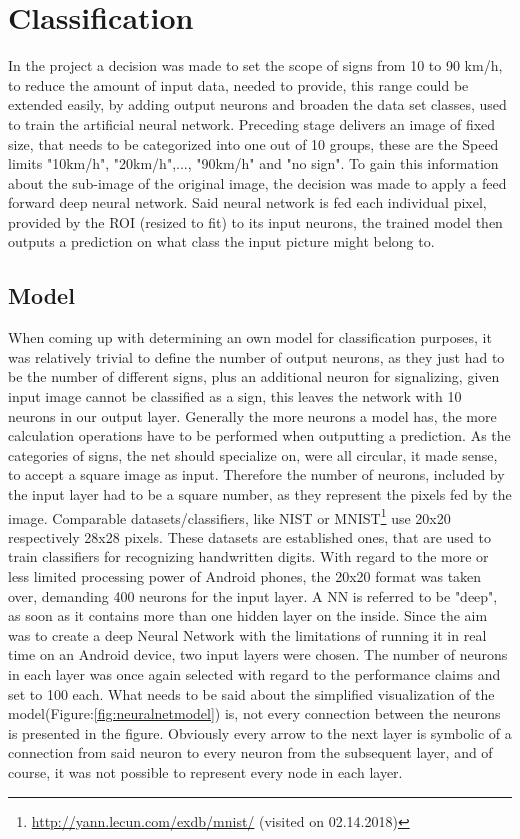 \section{Classification}
In the project a decision was made to set the scope of signs from 10 to 90 km/h, to reduce the amount of input data, needed to provide, this range could be extended easily, by adding output neurons and broaden the data set classes, used to train the artificial neural network. \newline
Preceding stage delivers an image of fixed size, that needs to be categorized into one out of 10 groups, these are the Speed limits "10km/h", "20km/h",..., "90km/h" and "no sign". To gain this information about the sub-image of the original image, the decision was made to apply a feed forward deep neural network. Said neural network is fed each individual pixel, provided by the ROI (resized to fit) to its input neurons, the trained model then outputs a prediction on what class the input picture might belong to.

\subsection{Model}
When coming up with determining an own model for classification purposes, it was relatively trivial to define the number of output neurons, as they just had to be the number of different signs, plus an additional neuron for signalizing, given input image cannot be classified as a sign, this leaves the network with 10 neurons in our output layer. Generally the more neurons a model has, the more calculation operations have to be performed when outputting a prediction.\newline
As the categories of signs, the net should specialize on, were all circular, it made sense, to accept a square image as input. Therefore the number of neurons, included by the input layer had to be a square number, as they represent the pixels fed by the image. Comparable datasets/classifiers, like NIST or MNIST\footnote{\url{http://yann.lecun.com/exdb/mnist/} (visited on 02.14.2018)} use 20x20 respectively 28x28 pixels. These datasets are established ones, that are used to train classifiers for recognizing handwritten digits. With regard to the more or less limited processing power of Android phones, the 20x20 format was taken over, demanding 400 neurons for the input layer. \newline
A NN is referred to be "deep", as soon as it contains more than one hidden layer on the inside.
Since the aim was to create a deep Neural Network with the limitations of running it in real time on an Android device, two input layers were chosen. The number of neurons in each layer was once again selected with regard to the performance claims and set to 100 each.\newline
What needs to be said about the simplified visualization of the model(Figure:\ref{fig:neuralnetmodel}) is, not every connection between the neurons is presented in the figure. Obviously every arrow to the next layer is symbolic of a connection from said neuron to every neuron from the subsequent layer, and of course, it was not possible to represent every node in each layer.

